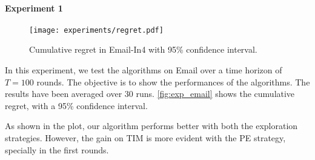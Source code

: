 \begin{example}
\paragraph{Experiment 1}

\begin{figure}[H]
  \centering
  \texttt{[image: experiments/regret.pdf]}
\caption{Cumulative regret in Email-In4 with 95\% confidence interval.}
\label{fig:exp_email}
\end{figure}

In this experiment, we test the algorithms on Email over a time horizon of $T=100$ rounds. The objective is to show the performances of the algorithms. The results have been averaged over 30 runs. \autoref{fig:exp_email} shows the cumulative regret, with a 95\% confidence interval.

As shown in the plot, our algorithm performs better with both the exploration strategies. However, the gain on TIM is more evident with the PE strategy, specially in the first rounds.
\end{example}